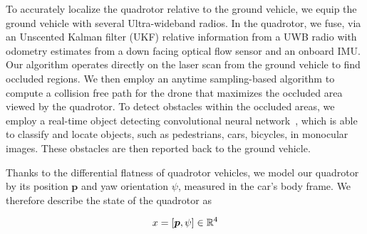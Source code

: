 
To accurately localize the quadrotor relative to the ground vehicle, we equip the ground vehicle with several Ultra-wideband radios. In the quadrotor, we fuse, via an Unscented Kalman filter (UKF) relative information from a UWB radio with odometry estimates from a down facing optical flow sensor and an onboard IMU.
Our algorithm operates directly on the laser scan from the ground vehicle to find occluded
regions.
We then employ an anytime sampling-based algorithm to compute a collision free path for the drone
that maximizes the occluded area viewed by the quadrotor.
To detect obstacles within the occluded areas, we employ a real-time object detecting convolutional neural network~\cite{yolo}, which is able to classify and locate objects, such as pedestrians, cars, bicycles, in monocular images. These obstacles are then reported back to the ground vehicle.



Thanks to the differential flatness of quadrotor vehicles, we model our quadrotor by its position $\bm{p}$ and yaw orientation $\psi$, measured in the car's body frame. We therefore describe the state of the quadrotor as

$$
    x = [\bm{p}, \psi] \in \mathbb{R}^4
$$


